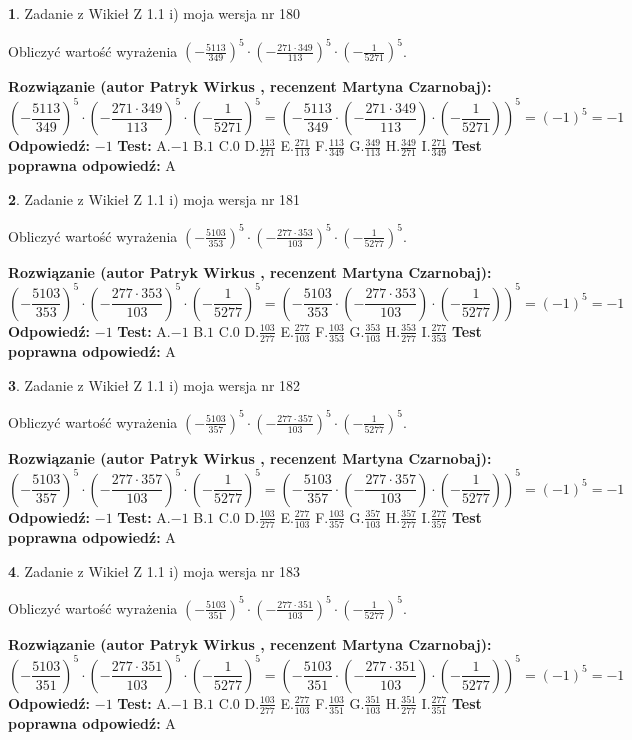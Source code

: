 \documentclass[12pt, a4paper]{article}
\theoremstyle{definition} %
\newtheorem{zad}{}
\newcommand{\zadStart}[1]{\begin{zad}#1\newline}
\newcommand{\zadStop}{\end{zad}}
\newcommand{\rozwStart}[2]{\noindent \textbf{Rozwiązanie (autor #1 , recenzent #2): }\newline}
\newcommand{\rozwStop}{\newline}
\newcommand{\odpStart}{\noindent \textbf{Odpowiedź:}\newline}
\newcommand{\odpStop}{\newline}
\newcommand{\testStart}{\noindent \textbf{Test:}\newline}
\newcommand{\testStop}{\newline}
\newcommand{\kluczStart}{\noindent \textbf{Test poprawna odpowiedź:}\newline}
\newcommand{\kluczStop}{\newline}
\begin{document}
\zadStart{Zadanie z Wikieł Z 1.1 i) moja wersja nr 180}

Obliczyć wartość wyrażenia $(-\frac{5113}{349})^{5} \cdot (-\frac{271 \cdot 349}{113})^{5} \cdot (-\frac{1}{5271})^{5}$.
\zadStop
\rozwStart{Patryk Wirkus}{Martyna Czarnobaj}
$$(-\frac{5113}{349})^{5} \cdot (-\frac{271 \cdot 349}{113})^{5} \cdot (-\frac{1}{5271})^{5} = (-\frac{5113}{349} \cdot (-\frac{271 \cdot 349}{113}) \cdot (-\frac{1}{5271}))^{5} = (-1)^{5} = -1$$
\rozwStop
\odpStart
$-1$
\odpStop
\testStart
A.$-1$ B.$1$ C.$0$ D.$\frac{113}{271}$ E.$\frac{271}{113}$
F.$\frac{113}{349}$ G.$\frac{349}{113}$
H.$\frac{349}{271}$
I.$\frac{271}{349}$
\testStop
\kluczStart
A
\kluczStop



\zadStart{Zadanie z Wikieł Z 1.1 i) moja wersja nr 181}

Obliczyć wartość wyrażenia $(-\frac{5103}{353})^{5} \cdot (-\frac{277 \cdot 353}{103})^{5} \cdot (-\frac{1}{5277})^{5}$.
\zadStop
\rozwStart{Patryk Wirkus}{Martyna Czarnobaj}
$$(-\frac{5103}{353})^{5} \cdot (-\frac{277 \cdot 353}{103})^{5} \cdot (-\frac{1}{5277})^{5} = (-\frac{5103}{353} \cdot (-\frac{277 \cdot 353}{103}) \cdot (-\frac{1}{5277}))^{5} = (-1)^{5} = -1$$
\rozwStop
\odpStart
$-1$
\odpStop
\testStart
A.$-1$ B.$1$ C.$0$ D.$\frac{103}{277}$ E.$\frac{277}{103}$
F.$\frac{103}{353}$ G.$\frac{353}{103}$
H.$\frac{353}{277}$
I.$\frac{277}{353}$
\testStop
\kluczStart
A
\kluczStop



\zadStart{Zadanie z Wikieł Z 1.1 i) moja wersja nr 182}

Obliczyć wartość wyrażenia $(-\frac{5103}{357})^{5} \cdot (-\frac{277 \cdot 357}{103})^{5} \cdot (-\frac{1}{5277})^{5}$.
\zadStop
\rozwStart{Patryk Wirkus}{Martyna Czarnobaj}
$$(-\frac{5103}{357})^{5} \cdot (-\frac{277 \cdot 357}{103})^{5} \cdot (-\frac{1}{5277})^{5} = (-\frac{5103}{357} \cdot (-\frac{277 \cdot 357}{103}) \cdot (-\frac{1}{5277}))^{5} = (-1)^{5} = -1$$
\rozwStop
\odpStart
$-1$
\odpStop
\testStart
A.$-1$ B.$1$ C.$0$ D.$\frac{103}{277}$ E.$\frac{277}{103}$
F.$\frac{103}{357}$ G.$\frac{357}{103}$
H.$\frac{357}{277}$
I.$\frac{277}{357}$
\testStop
\kluczStart
A
\kluczStop



\zadStart{Zadanie z Wikieł Z 1.1 i) moja wersja nr 183}

Obliczyć wartość wyrażenia $(-\frac{5103}{351})^{5} \cdot (-\frac{277 \cdot 351}{103})^{5} \cdot (-\frac{1}{5277})^{5}$.
\zadStop
\rozwStart{Patryk Wirkus}{Martyna Czarnobaj}
$$(-\frac{5103}{351})^{5} \cdot (-\frac{277 \cdot 351}{103})^{5} \cdot (-\frac{1}{5277})^{5} = (-\frac{5103}{351} \cdot (-\frac{277 \cdot 351}{103}) \cdot (-\frac{1}{5277}))^{5} = (-1)^{5} = -1$$
\rozwStop
\odpStart
$-1$
\odpStop
\testStart
A.$-1$ B.$1$ C.$0$ D.$\frac{103}{277}$ E.$\frac{277}{103}$
F.$\frac{103}{351}$ G.$\frac{351}{103}$
H.$\frac{351}{277}$
I.$\frac{277}{351}$
\testStop
\kluczStart
A
\kluczStop
\end{document}
